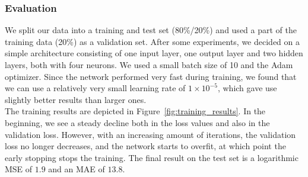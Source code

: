 \documentclass[acmsmall]{acmart}
\begin{document}
\subsubsection{Evaluation}
We split our data into a training and test set (80\%/20\%) and used a part of the training data (20\%) as a validation set. After some experiments, we decided on a simple architecture consisting of one input layer, one output layer and two hidden layers, both with four neurons. We used a small batch size of 10 and the Adam optimizer. Since the network performed very fast during training, we found that we can use a relatively very small learning rate of $1 \times 10^{-5}$, which gave use slightly better results than larger ones. \\
The training results are depicted in Figure~\ref{fig:training_results}. In the beginning, we see a steady decline both in the loss values and also in the validation loss. However, with an increasing amount of iterations, the validation loss no longer decreases, and the network starts to overfit, at which point the early stopping stops the training. 
The final result on the test set is a logarithmic MSE of $1.9$ and an MAE of $13.8$.
\end{document}
